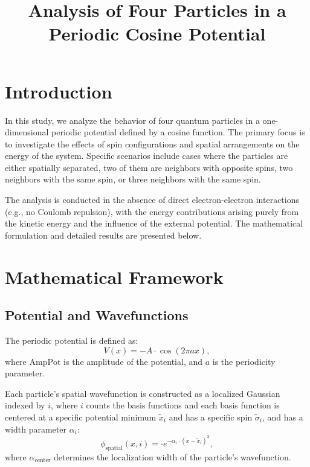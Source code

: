 \documentclass[11pt]{article}
\title{Analysis of Four Particles in a Periodic Cosine Potential}
\author{}
\date{}
\begin{document}
\maketitle

\section{Introduction}

In this study, we analyze the behavior of four quantum particles in a one-dimensional periodic potential defined by a cosine function. The primary focus is to investigate the effects of spin configurations and spatial arrangements on the energy of the system. Specific scenarios include cases where the particles are either spatially separated, two of them are neighbors with opposite spins, two neighbors with the same spin, or three neighbors with the same spin.

The analysis is conducted in the absence of direct electron-electron interactions (e.g., no Coulomb repulsion), with the energy contributions arising purely from the kinetic energy and the influence of the external potential. The mathematical formulation and detailed results are presented below.

\section{Mathematical Framework}

\subsection{Potential and Wavefunctions}

The periodic potential is defined as:
\begin{equation}
V(x) = -A \cdot \cos(2 \pi a x),
\end{equation}
where \(\text{AmpPot}\) is the amplitude of the potential, and \(a\) is the periodicity parameter.

Each particle's spatial wavefunction is constructed as a localized Gaussian indexed by \(i\), where \(i\) counts the basis functions and each basis function is centered at a specific potential minimum \(\tilde{x}_{i}\) and has a specific spin \(\tilde{\sigma}_i\), and has a width parameter \(\alpha_i\):
\begin{equation}
\phi_\text{spatial}(x, i) =  \cdot e^{-\alpha_i \cdot (x - \tilde{x}_{i})^2},
\end{equation}
where \(\alpha_\text{center}\) determines the localization width of the particle's wavefunction.
\end{document}
